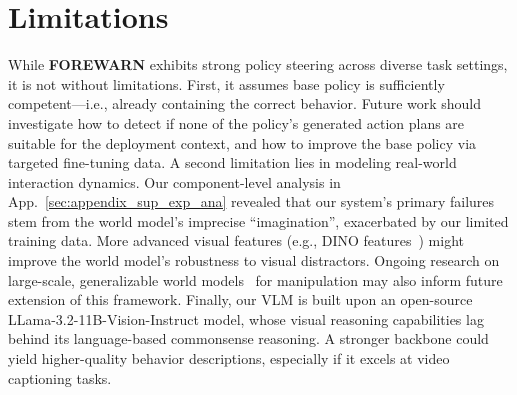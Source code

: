 \section{Limitations}
While \textbf{FOREWARN} exhibits strong policy steering across diverse task settings, it is not without limitations. First, it assumes base policy is sufficiently competent—i.e., already containing the correct behavior. Future work should investigate how to detect if none of the policy’s generated action plans are suitable for the deployment context, and how to improve the base policy via targeted fine-tuning data.
A second limitation lies in modeling real-world interaction dynamics. Our component-level analysis in App.~\ref{sec:appendix_sup_exp_ana} revealed that our system’s primary failures stem from the world model’s imprecise ``imagination'', exacerbated by our limited training data. More advanced visual features (e.g., DINO features~\citep{oquabdinov2}) might improve the world model’s robustness to visual distractors. Ongoing research on large-scale, generalizable world models~\citep{wu2024ivideogpt} for manipulation may also inform future extension of this framework.
Finally, our VLM is built upon an open-source LLama-3.2-11B-Vision-Instruct model, whose visual reasoning capabilities lag behind its language-based commonsense reasoning. A stronger backbone could yield higher-quality behavior descriptions, especially if it excels at video captioning tasks. 
